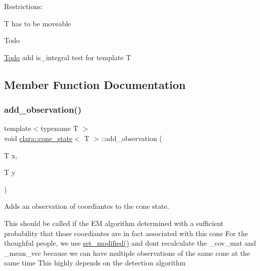 Restrictions\+:
\begin{DoxyItemize}
\item {\ttfamily T} has to be moveable
\end{DoxyItemize}

\begin{DoxyRefDesc}{Todo}
\item[\hyperlink{todo__todo000001}{Todo}]add {\ttfamily is\+\_\+integral} test for template {\ttfamily T} \end{DoxyRefDesc}


\subsection{Member Function Documentation}
\mbox{\label{classclara_1_1cone__state_a7cd7364ca787c25b0ca333d0cb1c3081}} 
\subsubsection{\texorpdfstring{add\+\_\+observation()}{add\_observation()}}
{\footnotesize\ttfamily template$<$typename T $>$ \\
void \hyperlink{classclara_1_1cone__state}{clara\+::cone\+\_\+state}$<$ T $>$\+::add\+\_\+observation (\begin{DoxyParamCaption}\item[{T}]{x,  }\item[{T}]{y }\end{DoxyParamCaption})\hspace{0.3cm}{\ttfamily [inline]}}



Adds an observation of coordiantes to the cone state. 

This should be called if the EM algorithm determined with a sufficient probability that those coordiantes are in fact associated with this cone For the thoughful people, we use {\ttfamily \hyperlink{classclara_1_1cone__state_ac9712fb4aee53df62da1cd320a45f813}{set\+\_\+modified()}} and don\textquotesingle{}t recalculate the {\ttfamily \+\_\+cov\+\_\+mat} and {\ttfamily \+\_\+mean\+\_\+vec} because we can have multiple observations of the same cone at the same time This highly depends on the detection algorithm

